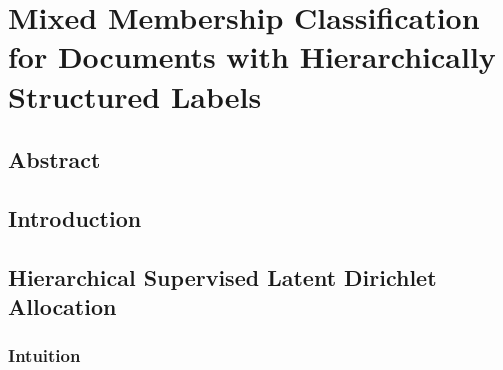 


\chapter{Mixed Membership Classification for Documents with Hierarchically Structured Labels}


\section{Abstract}
\label{sec:abstract} 


\section{Introduction}

\label{sec:introduction} 



\section{Hierarchical Supervised Latent Dirichlet Allocation}
\label{sec:HSLDA}



\subsection{Intuition}
\label{sec:intuition}




